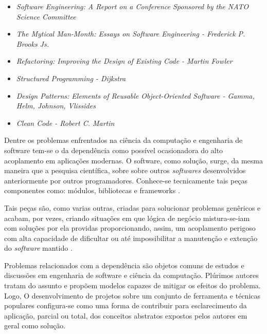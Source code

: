     \begin{itemize}
      \item{ \textit{Software Engineering: A Report on a Conference Sponsored by the NATO Science Committee} }
      \item{ \textit{The Mytical Man-Month: Essays on Software Engineering - Frederick P. Brooks Js. } }
      \item{ \textit{Refactoring: Improving the Design of Existing Code - Martin Fowler} }
      \item{ \textit{Structured Programming - Dijkstra} }
      \item{ \textit{Design Patterns: Elements of Reusable Object-Oriented Software - Gamma, Helm, Johnson, Vlissides} }
      \item{ \textit{Clean Code - Robert C. Martin} }
    \end{itemize}

    Dentre os problemas enfrentados na ciência da computação e engenharia de
    software tem-se o da dependência como possível ocasionadora do alto
    acoplamento em aplicações modernas. O software, como solução, surge, da
    mesma maneira que a pesquisa científica, sobre sobre outros
    \textit{softwares} desenvolvidos anteriormente por outros programadores.
    Conhece-se tecnicamente tais peças componentes como: módulos,
    bibliotecas e frameworks \cite{IEEEGlossary}.

    Tais peças são, como varias outras, criadas para solucionar problemas
    genêricos e acabam, por vezes, criando situações em que lógica de negócio
    mistura-se-iam com soluções por ela providas proporcionando, assim, um acoplamento
    perigoso com alta capacidade de dificultar ou até impossibilitar a manutenção e
    extenção do \textit{software} mantido \cite{evans2004domain, uncleBob2017}.

    Problemas relacionados com a dependência são objetos comuns de estudos
    e discussões em engenharia de software e ciência da computação. Plúrimos
    autores tratam do assunto e propõem modelos capazes de mitigar os efeitos
    do problema. Logo, O desenvolvimento de projetos sobre um conjunto de
    ferramenta e técnicas populares configura-se como uma forma de contribuir para
    esclarecimento da aplicação, parcial ou total, dos conceitos abstratos expostos
    pelos autores em geral como solução.

    
    
    
    

\newpage
